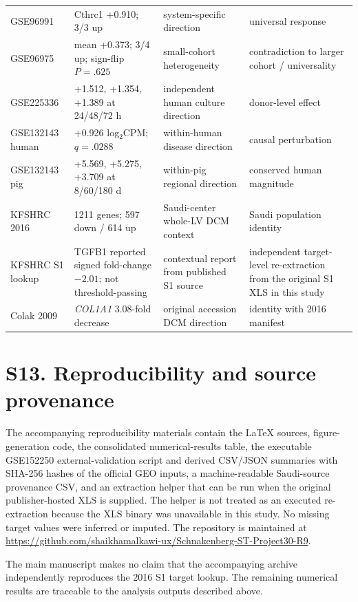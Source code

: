 \documentclass[11pt]{article}
\begin{document}
\begin{longtable}{p{2.2cm}p{4.2cm}p{4.0cm}p{3.2cm}}
GSE96991 & Cthrc1 +0.910; 3/3 up & system-specific direction & universal response\\
GSE96975 & mean +0.373; 3/4 up; sign-flip $P=.625$ & small-cohort heterogeneity & contradiction to larger cohort / universality\\
GSE225336 & +1.512, +1.354, +1.389 at 24/48/72 h & independent human culture direction & donor-level effect\\
GSE132143 human & +0.926 log$_2$CPM; $q=.0288$ & within-human disease direction & causal perturbation\\
GSE132143 pig & +5.569, +5.275, +3.709 at 8/60/180 d & within-pig regional direction & conserved human magnitude\\
KFSHRC 2016 & 1211 genes; 597 down / 614 up & Saudi-center whole-LV DCM context & Saudi population identity\\
KFSHRC S1 lookup & TGFB1 reported signed fold-change $-2.01$; \cthrc{} not threshold-passing & contextual report from published S1 source & independent target-level re-extraction from the original S1 XLS in this study\\
Colak 2009 & \textit{COL1A1} 3.08-fold decrease & original accession DCM direction & identity with 2016 manifest\\
\bottomrule
\end{longtable}

\section*{S13. Reproducibility and source provenance}
The accompanying reproducibility materials contain the LaTeX sources, figure-generation code, the consolidated numerical-results table, the executable GSE152250 external-validation script and derived CSV/JSON summaries with SHA-256 hashes of the official GEO inputs, a machine-readable Saudi-source provenance CSV, and an extraction helper that can be run when the original publisher-hosted XLS is supplied. The helper is not treated as an executed re-extraction because the XLS binary was unavailable in this study. No missing target values were inferred or imputed. The repository is maintained at \href{https://github.com/shaikhamalkawi-ux/Schnakenberg-ST-Project30-R9}{https://github.com/shaikhamalkawi-ux/Schnakenberg-ST-Project30-R9}.

The main manuscript makes no claim that the accompanying archive independently reproduces the 2016 S1 target lookup. The remaining numerical results are traceable to the analysis outputs described above.
\end{document}
